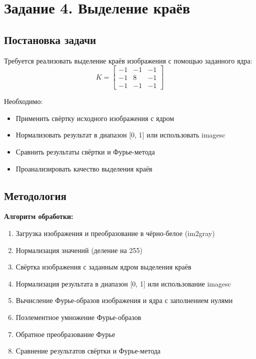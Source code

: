 \section*{Задание 4. Выделение краёв}

\subsection*{Постановка задачи}

Требуется реализовать выделение краёв изображения с помощью заданного ядра:
\begin{equation}
K = \begin{bmatrix}
-1 & -1 & -1 \\
-1 & 8 & -1 \\
-1 & -1 & -1
\end{bmatrix}
\end{equation}

Необходимо:
\begin{itemize}
    \item Применить свёртку исходного изображения с ядром
    \item Нормализовать результат в диапазон [0, 1] или использовать imagesc
    \item Сравнить результаты свёртки и Фурье-метода
    \item Проанализировать качество выделения краёв
\end{itemize}

\subsection*{Методология}

\textbf{Алгоритм обработки:}
\begin{enumerate}
    \item Загрузка изображения и преобразование в чёрно-белое (im2gray)
    \item Нормализация значений (деление на 255)
    \item Свёртка изображения с заданным ядром выделения краёв
    \item Нормализация результата в диапазон [0, 1] или использование imagesc
    \item Вычисление Фурье-образов изображения и ядра с заполнением нулями
    \item Поэлементное умножение Фурье-образов
    \item Обратное преобразование Фурье
    \item Сравнение результатов свёртки и Фурье-метода
\end{enumerate}

